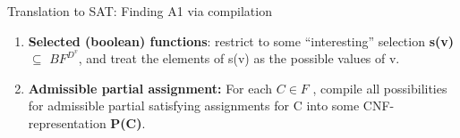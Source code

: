 \documentclass[xcolor=table	]{beamer}
\begin{document}
%

\begin{frame}{Translation to SAT: Finding A1 via compilation}
\begin{enumerate}
    \item \textbf{Selected (boolean) functions}: restrict to some “interesting” selection \textbf{s(v)} $\subseteq$ $BF^{D^v}$, and treat the elements of s(v) as the possible values of v. \newline 
    
    \item \textbf{Admissible partial assignment:} For each $C \in F$ , compile all possibilities for admissible partial satisfying assignments for C into some CNF-representation \textbf{P(C)}.
\end{enumerate}

\end{frame}

%  
% 
%
%
% 
\end{document}
